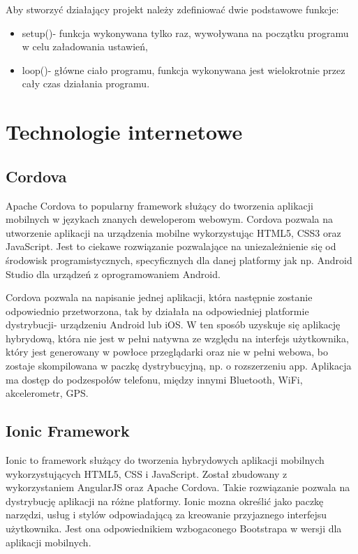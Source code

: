 Aby stworzyć działający projekt należy zdefiniować dwie podstawowe funkcje:
\begin{itemize}
\item setup()- funkcja wykonywana tylko raz, wywoływana na początku programu w celu załadowania ustawień,
\item loop()- główne ciało programu, funkcja wykonywana jest wielokrotnie przez cały czas działania programu.
\end{itemize}


\section{Technologie internetowe}
\subsection{Cordova} %
Apache Cordova to popularny framework służący do tworzenia aplikacji mobilnych w językach znanych deweloperom webowym. Cordova pozwala na utworzenie aplikacji na urządzenia mobilne wykorzystując HTML5, CSS3 oraz JavaScript. Jest to ciekawe rozwiązanie pozwalające na uniezależnienie się od środowisk programistycznych, specyficznych dla danej platformy jak np. Android Studio dla urządzeń z oprogramowaniem Android.

Cordova pozwala na napisanie jednej aplikacji, która następnie zostanie odpowiednio przetworzona, tak by działała na odpowiedniej platformie dystrybucji- urządzeniu Android lub iOS. W ten sposób uzyskuje się aplikację hybrydową, która nie jest w pełni natywna ze względu na interfejs użytkownika, który jest generowany w powłoce przeglądarki oraz nie w pełni webowa, bo zostaje skompilowana w paczkę dystrybucyjną, np. o rozszerzeniu app. Aplikacja ma dostęp do podzespołów telefonu, między innymi Bluetooth, WiFi, akcelerometr, GPS. 

\subsection{Ionic Framework}%
Ionic to framework służący do tworzenia hybrydowych aplikacji mobilnych wykorzystujących HTML5, CSS i JavaScript. Został zbudowany z wykorzystaniem AngularJS oraz Apache Cordova. Takie rozwiązanie pozwala na dystrybucję aplikacji na różne platformy. Ionic mozna określić jako paczkę narzędzi, usług i stylów odpowiadającą za kreowanie przyjaznego interfejsu użytkownika. Jest ona odpowiednikiem wzbogaconego Bootstrapa w wersji dla aplikacji mobilnych.

